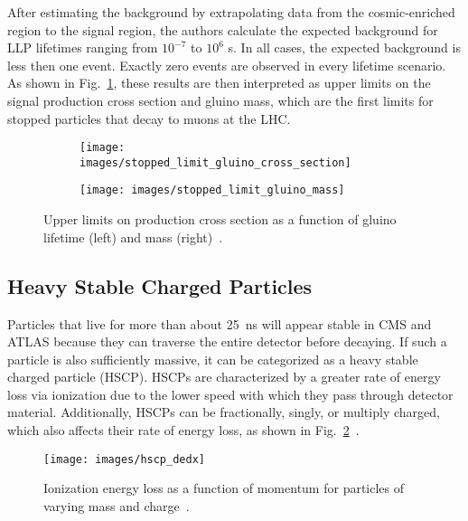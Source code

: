 \documentclass[12pt]{article}
\begin{document}
        After estimating the background by extrapolating data from the cosmic-enriched region to the signal region, the authors calculate the expected background for LLP lifetimes ranging from $10^{-7}$ to $10^6$ s. In all cases, the expected background is less then one event. Exactly zero events are observed in every lifetime scenario. As shown in Fig.~\ref{stopped_limits}, these results are then interpreted as upper limits on the signal production cross section and gluino mass, which are the first limits for stopped particles that decay to muons at the LHC.

        \noindent \begin{figure}[htbp] \begin{center}
        \begin{subfigure}[htbp]{0.5\textwidth} \begin{center}
        \texttt{[image: images/stopped\_limit\_gluino\_cross\_section]}
        \end{center} \end{subfigure}
        \begin{subfigure}[htbp]{0.45\textwidth} \begin{center}
        \texttt{[image: images/stopped\_limit\_gluino\_mass]}
        \end{center} \end{subfigure}
        \caption{Upper limits on production cross section as a function of gluino lifetime (left) and mass (right)~\cite{cms_stopped}.}
        \label{stopped_limits}
        \end{center} \end{figure}

    \subsection{Heavy Stable Charged Particles}
        Particles that live for more than about \SI{25}{\nano\s} will appear stable in CMS and ATLAS because they can traverse the entire detector before decaying. If such a particle is also sufficiently massive, it can be categorized as a heavy stable charged particle (HSCP). HSCPs are characterized by a greater rate of energy loss via ionization due to the lower speed with which they pass through detector material. Additionally, HSCPs can be fractionally, singly, or multiply charged, which also affects their rate of energy loss, as shown in Fig.~\ref{hscp_dedx}~\cite{cms_hscp}.

        \noindent \begin{figure}[htbp] \begin{center}
        \texttt{[image: images/hscp\_dedx]}
        \caption{Ionization energy loss as a function of momentum for particles of varying mass and charge~\cite{cms_hscp}.}
        \label{hscp_dedx}
        \end{center} \end{figure}
\end{document}
